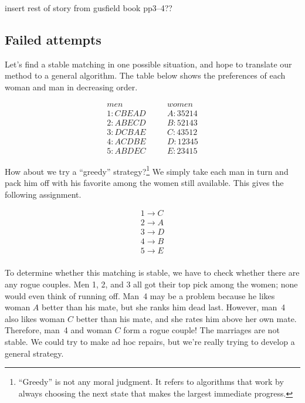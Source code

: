 \begin{editingnotes}
insert rest of story from gusfield book pp3--4??
\end{editingnotes}

\begin{editingnotes}
\subsection{Failed attempts}
Let's find a stable matching in one possible situation, and hope to
translate our method to a general algorithm.  The table below shows the
preferences of each woman and man in decreasing order.

\begin{eqnarray*}
men & \quad & women \\
1 : C B E A D & \quad & A : 3 5 2 1 4 \\
2 : A B E C D & \quad & B : 5 2 1 4 3 \\
3 : D C B A E & \quad & C : 4 3 5 1 2 \\
4 : A C D B E & \quad & D : 1 2 3 4 5 \\
5 : A B D E C & \quad & E : 2 3 4 1 5
\end{eqnarray*}

How about we try a ``greedy'' strategy?\footnote{``Greedy'' is not any
moral judgment.  It refers to algorithms that work by always choosing the
next state that makes the largest immediate progress.}  We simply take
each man in turn and pack him off with his favorite among the women still
available.  This gives the following assignment.

\begin{eqnarray*}
1 \rightarrow C \\
2 \rightarrow A \\
3 \rightarrow D \\
4 \rightarrow B \\
5 \rightarrow E \\
\end{eqnarray*}

To determine whether this matching is stable, we have to check whether
there are any rogue couples.  Men 1, 2, and 3 all got their top pick
among the women; none would even think of running off.  Man~4 may be a
problem because he likes woman $A$ better than his mate, but she ranks him
dead last.  However, man~4 also likes woman $C$ better than his mate, and
she rates him above her own mate.  Therefore, man~4 and woman $C$ form a
rogue couple!  The marriages are not stable.  We could try to make ad hoc
repairs, but we're really trying to develop a general strategy.


\end{editingnotes}
